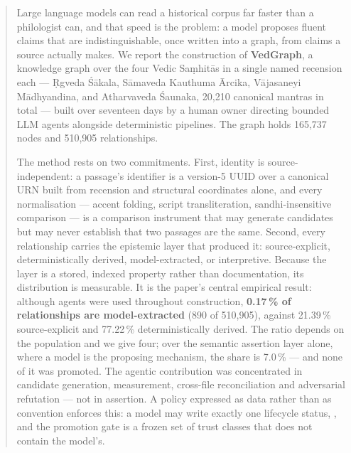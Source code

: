\begin{abstract}
\noindent
Large language models can read a historical corpus far faster than a philologist can,
and that speed is the problem: a model proposes fluent claims that are indistinguishable,
once written into a graph, from claims a source actually makes. We report the
construction of \textbf{VedGraph}, a knowledge graph over the four Vedic Sa\d{m}hit\=as
in a single named recension each --- \d{R}gveda \'S\=akala, S\=amaveda Kauthuma
\=Arcika, V\=ajasaneyi M\=adhyandina, and Atharvaveda \'Saunaka, 20{,}210 canonical
mantras in total --- built over seventeen days by a human owner directing bounded
\mbox{LLM} agents alongside deterministic pipelines. The graph holds 165{,}737 nodes and
510{,}905 relationships.

The method rests on two commitments. First, identity is source-independent: a passage's
identifier is a version-5 \mbox{UUID} over a canonical \mbox{URN} built from recension
and structural coordinates alone, and every normalisation --- accent folding, script
transliteration, sandhi-insensitive comparison --- is a comparison instrument that may
generate candidates but may never establish that two passages are the same. Second,
every relationship carries the epistemic layer that produced it: source-explicit,
deterministically derived, model-extracted, or interpretive. Because the layer is a
stored, indexed property rather than documentation, its distribution is measurable.
It is the paper's central empirical result: although agents were used throughout
construction, \textbf{0.17\,\% of relationships are model-extracted} (890 of 510{,}905),
against 21.39\,\% source-explicit and 77.22\,\% deterministically derived. The ratio
depends on the population and we give four; over the semantic assertion layer alone,
where a model is the proposing mechanism, the share is 7.0\,\% --- and none of it was
promoted. The agentic
contribution was concentrated in candidate generation, measurement, cross-file
reconciliation and adversarial refutation --- not in assertion. A policy expressed as
data rather than as convention enforces this: a model may write exactly one lifecycle
status, , and the promotion gate is a frozen set of trust classes that
does not contain the model's.


\end{abstract}
